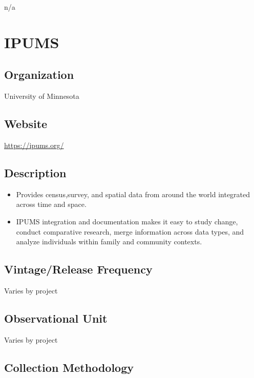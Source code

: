 \documentclass[
]{book}
\providecommand{\tightlist}{%
  \setlength{\itemsep}{0pt}\setlength{\parskip}{0pt}}
\begin{document}
n/a

\mainmatter

\hypertarget{ipums}{%
\chapter{IPUMS}\label{ipums}}

\hypertarget{organization-35}{%
\section{Organization}\label{organization-35}}

University of Minnesota

\hypertarget{website-35}{%
\section{Website}\label{website-35}}

\url{https://ipums.org/}

\hypertarget{description-35}{%
\section{Description}\label{description-35}}

\begin{itemize}
\tightlist
\item
  Provides census,survey, and spatial data from around the world integrated across time and space.
\item
  IPUMS integration and documentation makes it easy to study change, conduct comparative research, merge information across data types, and analyze individuals within family and community contexts.
\end{itemize}

\hypertarget{vintagerelease-frequency-35}{%
\section{Vintage/Release Frequency}\label{vintagerelease-frequency-35}}

Varies by project

\hypertarget{observational-unit-35}{%
\section{Observational Unit}\label{observational-unit-35}}

Varies by project

\hypertarget{collection-methodology-35}{%
\section{Collection Methodology}\label{collection-methodology-35}}
\end{document}
